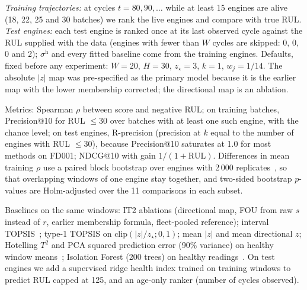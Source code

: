 \documentclass[journal,10pt,twocolumn]{IEEEtran}
\begin{document}
\emph{Training trajectories:} at cycles $t=80,90,\dots$ while at least 15 engines are alive (18, 22, 25 and 30 batches) we rank the live engines and compare with true RUL. \emph{Test engines:} each test engine is ranked once at its last observed cycle against the RUL supplied with the data (engines with fewer than $W$ cycles are skipped: 0, 0, 0 and 2); $\sigma^{\mathrm h}$ and every fitted baseline come from the training engines. Defaults, fixed before any experiment: $W=20$, $H=30$, $z_\star=3$, $k=1$, $w_j=1/14$. The absolute $|z|$ map was pre-specified as the primary model because it is the earlier map with the lower membership corrected; the directional map is an ablation.

Metrics: Spearman $\rho$ between score and negative RUL; on training batches, Precision@10 for RUL $\le30$ over batches with at least one such engine, with the chance level; on test engines, R-precision (precision at $k$ equal to the number of engines with RUL $\le30$), because Precision@10 saturates at 1.0 for most methods on FD001; NDCG@10 with gain $1/(1+\mathrm{RUL})$. Differences in mean training $\rho$ use a paired block bootstrap over engines with 2\,000 replicates~\cite{efron1993}, so that overlapping windows of one engine stay together, and two-sided bootstrap $p$-values are Holm-adjusted over the 11 comparisons in each subset.

Baselines on the same windows: IT2 ablations (directional map, FOU from raw $s$ instead of $r$, earlier membership formula, fleet-pooled reference); interval TOPSIS~\cite{jahanshahloo2006}; type-1 TOPSIS on $\mathrm{clip}(|z|/z_\star;0,1)$; mean $|z|$ and mean directional $z$; Hotelling $T^2$ and PCA squared prediction error (90\% variance) on healthy window means~\cite{macgregor1995}; Isolation Forest (200 trees) on healthy readings~\cite{liu2008iforest}. On test engines we add a supervised ridge health index trained on training windows to predict RUL capped at 125, and an age-only ranker (number of cycles observed).
\end{document}
